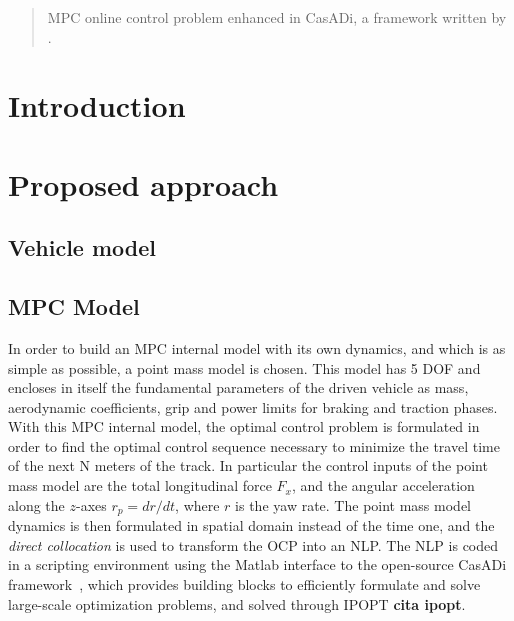 \documentclass[conference]{IEEEtran} %
\begin{document}

\begin{abstract}
MPC online control problem enhanced in CasADi, a framework written by \citet{Andersson2019}.
\end{abstract}

\IEEEpeerreviewmaketitle

\section{Introduction}



\section{Proposed approach} %


\subsection{Vehicle model}

\subsection{MPC Model}
In order to build an MPC internal model with its own dynamics, and which is as simple as possible, a point mass model is chosen. 
This model has 5 DOF and encloses in itself the fundamental parameters of the driven vehicle as mass, aerodynamic coefficients, grip and power limits for braking and traction phases.
With this MPC internal model, the optimal control problem is formulated in order to find the optimal control sequence necessary to minimize the travel time of the next N meters of the track. In particular the control inputs of the point mass model are the total longitudinal force $F_{x}$, and the angular acceleration along the $z$-axes $r_p = dr/dt$, where $r$ is the yaw rate.
The point mass model dynamics is then formulated in spatial domain instead of the time one, and the \textit{direct collocation} is used to transform the OCP into an NLP. The NLP is coded in a scripting environment using the Matlab interface to the open-source CasADi framework~\cite{Andersson2019}, which provides building
blocks to efficiently formulate and solve large-scale optimization problems, and solved through IPOPT \textbf{cita ipopt}.
\end{document}
